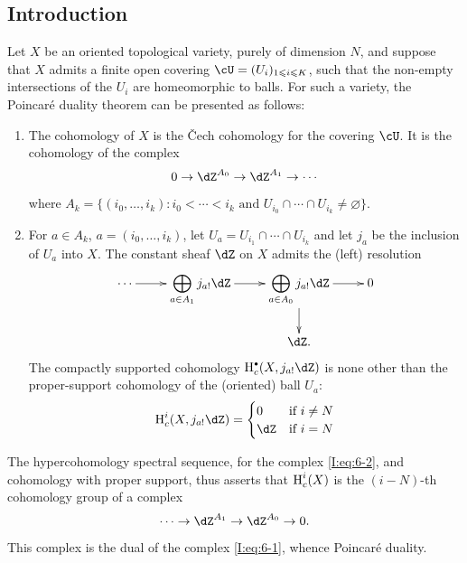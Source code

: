 \subsection{Introduction}\label{I:6-1}

Let $X$ be an oriented topological variety, purely of dimension $N$, and
suppose that $X$ admits a finite open covering
$\cU=(U_i)_{1\leqslant i\leqslant K}$, such that the non-empty intersections
of the $U_i$ are homeomorphic to balls. For such a variety,
the Poincar\'e duality theorem can be presented as follows: 

\begin{enumerate}[\indent A]
  \item The cohomology of $X$ is the \v Cech cohomology for the
    covering $\cU$. It is the cohomology of the complex
    \begin{equation}\label{I:eq:6-1}
      0 \to \dZ^{A_0} \to \dZ^{A_1} \to \cdots
    \end{equation}
    where $A_k=\{(i_0,\dotsc,i_k) : i_0<\cdots<i_k\text{ and } U_{i_0}\cap \cdots \cap U_{i_k} \ne \varnothing\}$.
    \item For $a\in A_k$, $a=(i_0,\dotsc,i_k)$, let
      $U_a=U_{i_1}\cap \cdots \cap U_{i_k}$ and let $j_a$ be the inclusion of $U_a$
      into $X$. The constant sheaf $\dZ$ on $X$ admits the (left)
      resolution
      \begin{equation}\label{I:eq:6-2}
      \xymatrix{
        \cdots \ar[r]
          & \displaystyle\bigoplus_{a\in A_1} j_{a!}\dZ \ar[r]
          & \displaystyle\bigoplus_{a\in A_0} j_{a!} \dZ \ar[r] \ar[d]
          & 0 \\
        & & \dZ \text{.}
      }
      \end{equation}
      The compactly supported cohomology $\h_c^\bullet(X,j_{a!}\dZ)$ is none
      other than the proper-support cohomology of the (oriented) ball $U_a$:
        \[
          \h_c^i(X,j_{a!}\dZ) = \begin{cases}
                                  0   & \text{if $i\ne N$} \\
                                  \dZ & \text{if $i = N$}
                                \end{cases}
        \]
\end{enumerate}

The hypercohomology spectral sequence, for the complex \eqref{I:eq:6-2}, and
cohomology with proper support, thus asserts that $\operatorname{H}_c^i(X)$ is the
$(i-N)$-th cohomology group of a complex
\begin{equation}\label{I:eq:6-3}
  \cdots \to \dZ^{A_1} \to \dZ^{A_0} \to 0 \text{.}
\end{equation}
This complex is the dual of the complex \eqref{I:eq:6-1}, whence Poincar\'e
duality.

